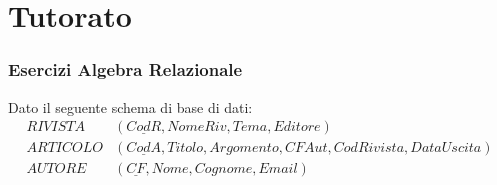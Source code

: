 \documentclass{article}
\begin{document}
\newpage
\part{Tutorato}
\section{Esercizi Algebra Relazionale}
Dato il seguente schema di base di dati: \begin{align*}
	RIVISTA&(\underline{CodR},NomeRiv,Tema,Editore)\\
	ARTICOLO&(\underline{CodA},Titolo, Argomento, CFAut,CodRivista, DataUscita)\\
	AUTORE&(\underline{CF},Nome, Cognome, Email)\\
\end{align*}
\end{document}
